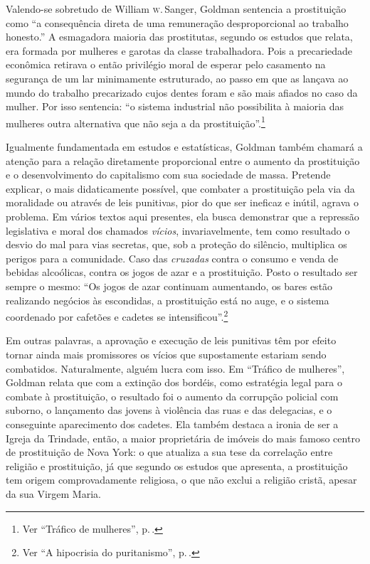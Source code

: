 Valendo-se sobretudo de William \textsc{w}.\,Sanger, Goldman sentencia a
prostituição como ``a consequência direta de uma remuneração
desproporcional ao trabalho honesto.'' A esmagadora maioria das
prostitutas, segundo os estudos que relata, era formada por mulheres e
garotas da classe trabalhadora. Pois a precariedade econômica retirava
o então privilégio moral de esperar pelo casamento na segurança
de um lar minimamente estruturado, ao passo em que
as lançava ao mundo do trabalho precarizado cujos dentes
foram e são mais afiados no caso da mulher. Por isso sentencia:
``o sistema industrial não possibilita à maioria das mulheres outra alternativa que não seja a da prostituição''.\footnote{Ver ``Tráfico de mulheres'', p.\,\pageref{trafico}.}

Igualmente fundamentada em estudos e estatísticas, Goldman também
chamará a atenção para a relação diretamente proporcional entre o
aumento da prostituição e o desenvolvimento do capitalismo com sua
sociedade de massa. Pretende explicar, o mais didaticamente
possível, que combater a prostituição pela via da moralidade ou através
de leis punitivas, pior do que ser ineficaz e inútil, agrava o problema.
Em vários textos aqui presentes, ela busca demonstrar que a repressão
legislativa e moral dos chamados \textit{vícios}, invariavelmente, tem como
resultado o desvio do mal para vias secretas, que, sob a proteção do silêncio,
multiplica os perigos para a comunidade.
Caso das
\textit{cruzadas} contra o consumo e venda de bebidas alcoólicas, contra os
jogos de azar e a prostituição. Posto o resultado ser sempre o mesmo:
``Os jogos de azar continuam aumentando, os bares estão realizando
negócios às escondidas, a prostituição está no auge, e o sistema
coordenado por cafetões e cadetes se intensificou''.\footnote{Ver ``A hipocrisia do puritanismo'', p.\,\pageref{hipocrisia}.}

Em outras palavras,
a aprovação e execução de leis punitivas têm por efeito tornar ainda
mais promissores os vícios que supostamente estariam sendo combatidos.
Naturalmente, alguém lucra com isso. Em ``Tráfico de mulheres'', Goldman
relata que com a extinção dos bordéis, como estratégia legal para o
combate à prostituição, o resultado foi o aumento da corrupção policial
com suborno, o lançamento das jovens à violência das ruas e das
delegacias, e o conseguinte aparecimento dos cadetes. Ela também
destaca a ironia de ser a Igreja da Trindade, então, a maior
proprietária de imóveis do mais famoso centro de prostituição de Nova
York: o que atualiza a sua tese da correlação entre religião e
prostituição, já que segundo os estudos que apresenta, a prostituição
tem origem comprovadamente religiosa, o que não exclui a religião
cristã, apesar da sua Virgem Maria. 

